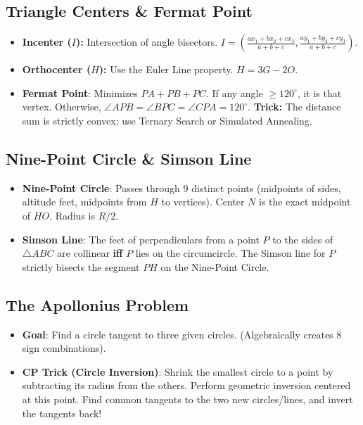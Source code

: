 \documentclass[12pt]{article}
\begin{document}
\subsection{Triangle Centers \& Fermat Point}
\begin{itemize}
    \item \textbf{Incenter ($I$):} Intersection of angle bisectors. $I = (\frac{ax_1 + bx_2 + cx_3}{a+b+c}, \frac{ay_1 + by_2 + cy_3}{a+b+c})$.
    \item \textbf{Orthocenter ($H$):} Use the Euler Line property. $H = 3G - 2O$.
    \item \textbf{Fermat Point}: Minimizes $PA + PB + PC$. If any angle $\ge 120^\circ$, it is that vertex. Otherwise, $\angle APB = \angle BPC = \angle CPA = 120^\circ$. \textbf{Trick:} The distance sum is strictly convex; use Ternary Search or Simulated Annealing.
\end{itemize}

\subsection{Nine-Point Circle \& Simson Line}
\begin{itemize}
    \item \textbf{Nine-Point Circle}: Passes through 9 distinct points (midpoints of sides, altitude feet, midpoints from $H$ to vertices). Center $N$ is the exact midpoint of $HO$. Radius is $R/2$.
    \item \textbf{Simson Line}: The feet of perpendiculars from a point $P$ to the sides of $\triangle ABC$ are collinear \textbf{iff} $P$ lies on the circumcircle. The Simson line for $P$ strictly bisects the segment $PH$ on the Nine-Point Circle.
\end{itemize}

\subsection{The Apollonius Problem}
\begin{itemize}
    \item \textbf{Goal}: Find a circle tangent to three given circles. (Algebraically creates 8 sign combinations).
    \item \textbf{CP Trick (Circle Inversion)}: Shrink the smallest circle to a point by subtracting its radius from the others. Perform geometric inversion centered at this point. Find common tangents to the two new circles/lines, and invert the tangents back!
\end{itemize}
\end{document}
